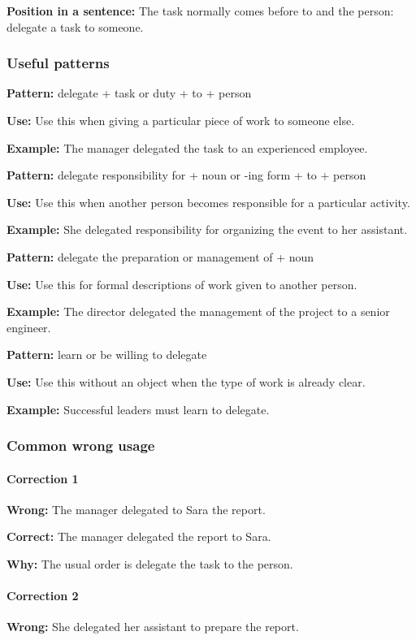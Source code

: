 \documentclass[11pt]{article}
\begin{document}
\textbf{Position in a sentence:} The task normally comes before to and the person: delegate a task to someone.

\subsubsection{Useful patterns}
\textbf{Pattern:} delegate + task or duty + to + person

\textbf{Use:} Use this when giving a particular piece of work to someone else.

\textbf{Example:} The manager delegated the task to an experienced employee.

\textbf{Pattern:} delegate responsibility for + noun or -ing form + to + person

\textbf{Use:} Use this when another person becomes responsible for a particular activity.

\textbf{Example:} She delegated responsibility for organizing the event to her assistant.

\textbf{Pattern:} delegate the preparation or management of + noun

\textbf{Use:} Use this for formal descriptions of work given to another person.

\textbf{Example:} The director delegated the management of the project to a senior engineer.

\textbf{Pattern:} learn or be willing to delegate

\textbf{Use:} Use this without an object when the type of work is already clear.

\textbf{Example:} Successful leaders must learn to delegate.

\subsubsection{Common wrong usage}
\paragraph{Correction 1}
\textbf{Wrong:} The manager delegated to Sara the report.

\textbf{Correct:} The manager delegated the report to Sara.

\textbf{Why:} The usual order is delegate the task to the person.

\paragraph{Correction 2}
\textbf{Wrong:} She delegated her assistant to prepare the report.
\end{document}
